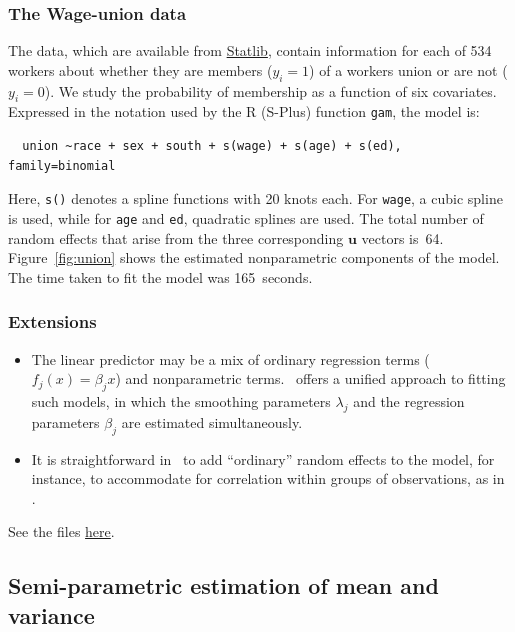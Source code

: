 \documentclass{admbmanual}
\newcommand{\citeasnoun}{\cite}
\begin{document}
\subsubsection{The Wage-union data}

The data, which are available from \href{lib.stat.cmu.edu/}{Statlib}, contain
information for each of 534 workers about whether they are members ($y_{i}=1$)
of a workers union or are not ($y_{i}=0$). We study the probability of
membership as a function of six covariates. Expressed in the notation used by
the R (S-Plus) function \texttt{gam}, the model is:
\begin{verbatim}
  union ~race + sex + south + s(wage) + s(age) + s(ed), family=binomial
\end{verbatim}

Here, \texttt{s()} denotes a spline functions with 20 knots each. For
\texttt{wage}, a cubic spline is used, while for \texttt{age} and \texttt{ed},
quadratic splines are used. The total number of random effects that arise from
the three corresponding $\mathbf{u}$ vectors is~64. Figure~\ref{fig:union} shows
the estimated nonparametric components of the model. The time taken to fit the
model was 165~seconds.

\subsubsection{Extensions}

\begin{itemize}
  \item The linear predictor may be a mix of ordinary regression terms
  ($f_{j}(x)=\beta _{j}x$) and nonparametric terms. \scAR\ offers a unified
  approach to fitting such models, in which the smoothing parameters $\lambda
  _{j}$ and the regression parameters $\beta _{j}$ are estimated simultaneously.

  \item It is straightforward in \scAR\ to add ``ordinary'' random effects to
  the model, for instance, to accommodate for correlation within groups of
  observations, as in \citeasnoun{lin:zhan:1999}.
\end{itemize}

See the files
\href{http://otter-rsch.com/admbre/examples/union/union.html}{here}.

\subsection{Semi-parametric estimation of mean and variance}
\label{sec:lidar}
\end{document}
